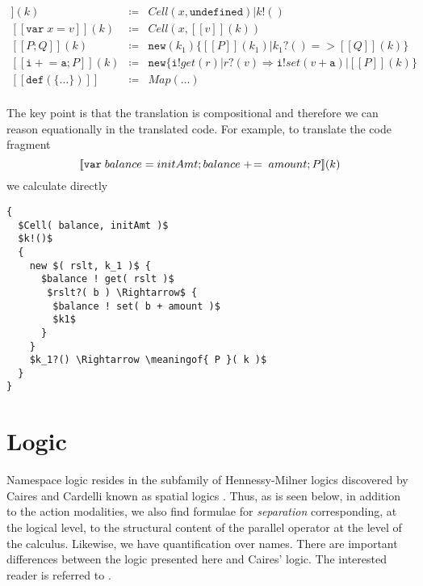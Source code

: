 \documentclass[]{amsart}
\newcommand{\ldb}{[\![}
\newcommand{\rdb}{]\!]}
\newcommand{\id}[1]{\texttt{#1}}
\newcommand{\juxtap}{\mathbin{\id{|}}}
\newcommand{\binpar}[2]{#1 \juxtap #2}
\newcommand{\meaningof}[1]{\ldb #1 \rdb}
\newcommand{\defneqls}{\coloneqq}
\theoremstyle{definition}
\theoremstyle{remark}
\numberwithin{equation}{subsection}
\begin{document}
\begin{eqnarray*}
 \meaningof{\texttt{var}\; x}( k ) & \defneqls & \binpar{Cell( x, \texttt{undefined} )}{k!()} \\
 \meaningof{\texttt{var}\; x = v}( k ) & \defneqls & Cell( x, \meaningof{ v }( k ) ) \\
 \meaningof{ P ; Q }( k ) & \defneqls & \texttt{new}(k_1)\{ \binpar{\meaningof{ P }( k_1 )}{ k_1?() => \meaningof{ Q }( k )} \} \\
 \meaningof{ \texttt{i} +\!= \texttt{a} ; P }( k ) & \defneqls & \texttt{new} \{ \binpar{\binpar{\texttt{i} ! get( r )}{r?( v ) \Rightarrow \texttt{i}! set( v + \texttt{a} ) }}{\meaningof{P}( k )} \}\\
 \meaningof{\texttt{def}(\{\ldots\})} & \defneqls & Map( \ldots ) \\
\end{eqnarray*}



The key point is that the translation is compositional and therefore
we can reason equationally in the translated code. For example, to
translate the code fragment 
\[\meaningof{ \mbox{\tt var}\; balance = initAmt; balance\; +\!= \; amount; P }( k )\]
we calculate directly


\begin{lstlisting}[mathescape]
{ 
  $Cell( balance, initAmt )$
  $k!()$
  {
    new $( rslt, k_1 )$ {
      $balance ! get( rslt )$  
       $rslt?( b ) \Rightarrow$ {
        $balance ! set( b + amount )$
        $k1$
      }
    } 
    $k_1?() \Rightarrow \meaningof{ P }( k )$
  }
}
\end{lstlisting}

\section{Logic}
Namespace logic resides in the subfamily of Hennessy-Milner logics
discovered by Caires and Cardelli known as spatial logics
\cite{DBLP:conf/fossacs/Caires04}. Thus, as is seen below, in addition
to the action modalities, we also find formulae for \emph{separation}
corresponding, at the logical level, to the structural content of the
parallel operator at the level of the calculus. Likewise, we have
quantification over names. There are important differences between the
logic presented here and Caires' logic. The interested reader is
referred to \cite{DBLP:conf/tgc/MeredithR05}.
\end{document}

